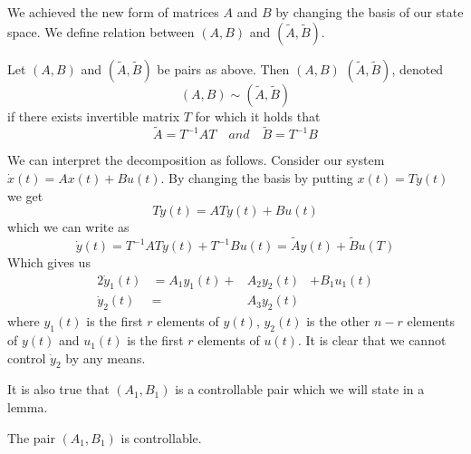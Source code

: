 We achieved the new form of matrices $A$ and $B$ by changing the basis of our state space. We define relation between $(A,B)$ and $(\widetilde{A},\widetilde{B}).$

\begin{definition}
	Let $(A,B)$ and $(\widetilde{A},\widetilde{B})$ be pairs as above. Then $(A,B)$  $(\widetilde{A},\widetilde{B})$, denoted $$(A,B) \sim (\widetilde{A},\widetilde{B})$$ if there exists invertible matrix $T$ for which it holds that $$\widetilde{A}=T^{-1}AT\quad and\quad\widetilde{B}=T^{-1}B$$
\end{definition}

We can interpret the decomposition as follows. Consider our system $\dot{x}(t)=Ax(t)+Bu(t)$. By changing the basis by putting $x(t)=Ty(t)$ we get $$T\dot{y}(t)=ATy(t)+Bu(t)$$ which we can write as $$\dot{y}(t)=T^{-1}ATy(t)+T^{-1}Bu(t)=\widetilde{A}y(t)+\widetilde{B}u(T)$$ Which gives us 
\begin{alignat*}{2}
	\dot{y}_1(t)&=A_1y_1(t)+&A_2y_2(t)&+B_1u_1(t) \\
	\dot{y}_2(t)&=&A_3y_2(t)&
\end{alignat*}
where $y_1(t)$ is the first $r$ elements of $y(t)$, $y_2(t)$ is the other $n-r$ elements of $y(t)$ and $u_1(t)$ is the first $r$ elements of $u(t)$. It is clear that we cannot control $\dot{y}_2$ by any means. 

It is also true that $(A_1,B_1)$ is a controllable pair which we will state in a lemma.

\begin{lemma}
	The pair $(A_1,B_1)$ is controllable.
\end{lemma}

